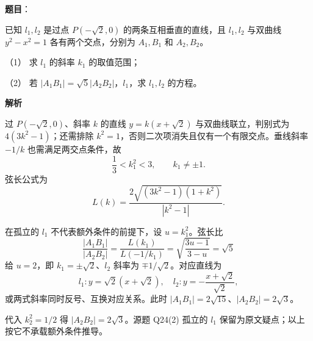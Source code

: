 \begin{answer}

\textbf{题目}：

已知 $l_1,l_2$ 是过点 $P(-\sqrt{2},0)$ 的两条互相垂直的直线，且 $l_1,l_2$ 与双曲线 $y^2-x^2=1$ 各有两个交点，分别为 $A_1,B_1$ 和 $A_2,B_2$。

（1） 求 $l_1$ 的斜率 $k_1$ 的取值范围；

（2） 若 $\left|A_1B_1\right|=\sqrt{5}\left|A_2B_2\right|$，$l_1$，求 $l_1,l_2$ 的方程。

\textbf{解析}


过 $P(-\sqrt2,0)$、斜率 $k$ 的直线 $y=k(x+\sqrt2)$ 与双曲线联立，判别式为 $4(3k^2-1)$；还需排除 $k^2=1$，否则二次项消失且仅有一个有限交点。垂线斜率 $-1/k$ 也需满足两交点条件，故
\nopagebreak[4]
\[
\frac13<k_1^2<3,\qquad k_1\ne\pm1.
\]
弦长公式为
\nopagebreak[4]
\[
L(k)=\frac{2\sqrt{(3k^2-1)(1+k^2)}}{|k^2-1|}.
\]


在孤立的 $l_1$ 不代表额外条件的前提下，设 $u=k_1^2$。弦长比
\nopagebreak[4]
\[
\frac{|A_1B_1|}{|A_2B_2|}=\frac{L(k_1)}{L(-1/k_1)}=\sqrt{\frac{3u-1}{3-u}}=\sqrt5
\]
给 $u=2$，即 $k_1=\pm\sqrt2$、$l_2$ 斜率为 $\mp1/\sqrt2$。对应直线为
\nopagebreak[4]
\[
l_1:y=\sqrt2(x+\sqrt2),\quad l_2:y=-\frac{x+\sqrt2}{\sqrt2},
\]
或两式斜率同时反号、互换对应关系。此时 $|A_1B_1|=2\sqrt{15}$、$|A_2B_2|=2\sqrt3$。

代入 $k_2^2=1/2$ 得 $|A_2B_2|=2\sqrt3$。源题 Q24(2) 孤立的 $l_1$ 保留为原文疑点；以上按它不承载额外条件推导。



\end{answer}
